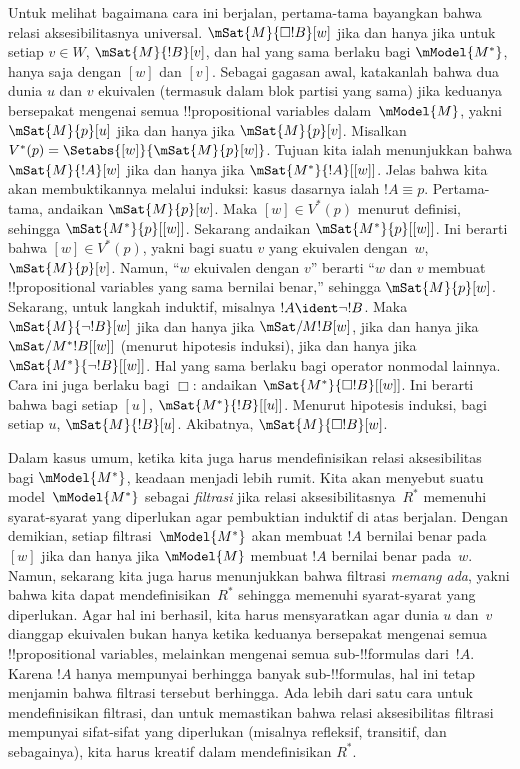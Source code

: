 \documentclass[../../../include/open-logic-section]{subfiles}
\begin{document}
Untuk melihat bagaimana cara ini berjalan, pertama-tama bayangkan bahwa relasi
aksesibilitasnya universal. $\mSat{M}{\Box !B}[w]$ jika dan
hanya jika untuk setiap $v \in W$, $\mSat{M}{!B}[v]$, dan hal yang sama
berlaku bagi $\mModel{M^*}$, hanya saja dengan $[w]$ dan $[v]$. Sebagai
gagasan awal, katakanlah bahwa dua dunia $u$ dan $v$ ekuivalen (termasuk dalam
blok partisi yang sama) jika keduanya bersepakat mengenai semua
!!{propositional variable}s dalam~$\mModel{M}$, yakni $\mSat{M}{p}[u]$ jika
dan hanya jika $\mSat{M}{p}[v]$. Misalkan
$V^*(p) = \Setabs{[w]}{\mSat{M}{p}[w]}$. Tujuan kita ialah menunjukkan bahwa
$\mSat{M}{!A}[w]$ jika dan hanya jika $\mSat{M^*}{!A}[{[w]}]$. Jelas bahwa
kita akan membuktikannya melalui induksi: kasus dasarnya ialah $!A \equiv p$.
Pertama-tama, andaikan $\mSat{M}{p}[w]$. Maka $[w] \in V^*(p)$ menurut
definisi, sehingga $\mSat{M^*}{p}[{[w]}]$. Sekarang andaikan
$\mSat{M^*}{p}[{[w]}]$. Ini berarti bahwa $[w] \in V^*(p)$, yakni bagi suatu
$v$ yang ekuivalen dengan~$w$, $\mSat{M}{p}[v]$. Namun, ``$w$ ekuivalen
dengan $v$'' berarti ``$w$ dan $v$ membuat !!{propositional variable}s yang
sama bernilai benar,'' sehingga $\mSat{M}{p}[w]$. Sekarang, untuk langkah
induktif, misalnya $!A \ident \lnot !B$. Maka
$\mSat{M}{\lnot !B}[w]$ jika dan hanya jika $\mSat/{M}{!B}[w]$, jika dan
hanya jika $\mSat/{M^*}{!B}[{[w]}]$ (menurut hipotesis induksi), jika dan
hanya jika $\mSat{M^*}{\lnot !B}[{[w]}]$. Hal yang sama berlaku bagi operator
nonmodal lainnya. Cara ini juga berlaku bagi $\Box$: andaikan
$\mSat{M^*}{\Box !B}[{[w]}]$. Ini berarti bahwa bagi setiap $[u]$,
$\mSat{M^*}{!B}[{[u]}]$. Menurut hipotesis induksi, bagi setiap $u$,
$\mSat{M}{!B}[u]$. Akibatnya, $\mSat{M}{\Box !B}[w]$.

Dalam kasus umum, ketika kita juga harus mendefinisikan relasi aksesibilitas
bagi $\mModel{M^*}$, keadaan menjadi lebih rumit. Kita akan menyebut suatu
model~$\mModel{M^*}$ sebagai \emph{filtrasi} jika relasi
aksesibilitasnya~$R^*$ memenuhi syarat-syarat yang diperlukan agar pembuktian
induktif di atas berjalan. Dengan demikian, setiap filtrasi~$\mModel{M^*}$
akan membuat $!A$ bernilai benar pada $[w]$ jika dan hanya jika
$\mModel{M}$ membuat $!A$ bernilai benar pada~$w$. Namun, sekarang kita juga
harus menunjukkan bahwa filtrasi \emph{memang ada}, yakni bahwa kita dapat
mendefinisikan~$R^*$ sehingga memenuhi syarat-syarat yang diperlukan. Agar
hal ini berhasil, kita harus mensyaratkan agar dunia $u$ dan~$v$ dianggap
ekuivalen bukan hanya ketika keduanya bersepakat mengenai semua
!!{propositional variable}s, melainkan mengenai semua sub-!!{formula}s
dari~$!A$. Karena $!A$ hanya mempunyai berhingga banyak sub-!!{formula}s,
hal ini tetap menjamin bahwa filtrasi tersebut berhingga. Ada lebih dari satu
cara untuk mendefinisikan filtrasi, dan untuk memastikan bahwa relasi
aksesibilitas filtrasi mempunyai sifat-sifat yang diperlukan (misalnya
refleksif, transitif, dan sebagainya), kita harus kreatif dalam mendefinisikan
$R^*$.
\end{document}
